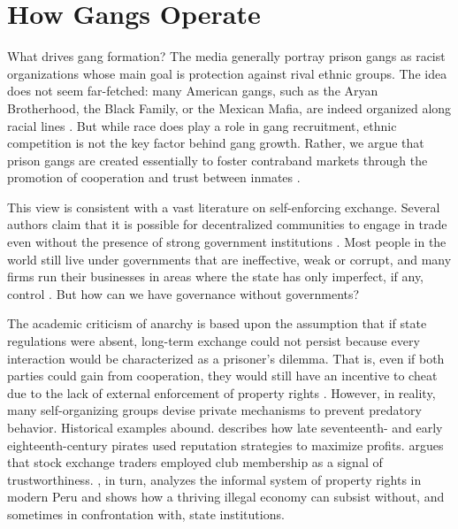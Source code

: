 \documentclass[a4paper, 12pt]{article}
\begin{document}
\section{How Gangs Operate}
\label{sec:gangsoperate}

\noindent
What drives gang formation? The media generally portray prison gangs as racist organizations whose main goal is protection against rival ethnic groups. The idea does not seem far-fetched: many American gangs, such as the Aryan Brotherhood, the Black Family, or the Mexican Mafia, are indeed organized along racial lines \citep{fong1990organizational,hunt1993change,pelz1991right}. But while race does play a role in gang recruitment, ethnic competition is not the key factor behind gang growth. Rather, we argue that prison gangs are created essentially to foster contraband markets through the promotion of cooperation and trust between inmates \citep{fleisher2001overview,roth2014prison}. 

This view is consistent with a vast literature on self-enforcing exchange. Several authors claim that it is possible for decentralized communities to engage in trade even without the presence of strong government institutions \citep[e.g.][]{dixit2007lawlessness,friedman1989machinery,leeson2007efficient,ostrom1992covenants,powell2009public,stringham2005anarchy,tullock1972explorations,tullock1974further}. Most people in the world still live under governments that are ineffective, weak or corrupt, and many firms run their businesses in areas where the state has only imperfect, if any, control \citep[p. 504]{powell2009public}. But how can we have governance without governments?

The academic criticism of anarchy is based upon the assumption that if state regulations were absent, long-term exchange could not persist because every interaction would be characterized as a prisoner's dilemma. That is, even if both parties could gain from cooperation, they would still have an incentive to cheat due to the lack of external enforcement of property rights \citep{bush1972individual,buchanan1975limits,mueller1988anarchy,tullock1972edge}. However, in reality, many self-organizing groups devise private mechanisms to prevent predatory behavior. Historical examples abound. \citet{leeson2007arrgh,leeson2007efficient,leeson2009rationality,leeson2009calculus,leeson2010pirational} describes how late seventeenth- and early eighteenth-century pirates used reputation strategies to maximize profits. \citet{stringham2015private} argues that stock exchange traders employed club membership as a signal of trustworthiness. \citet{de1990other}, in turn, analyzes the informal system of property rights in modern Peru and shows how a thriving illegal economy can subsist without, and sometimes in confrontation with, state institutions. 
\end{document}
